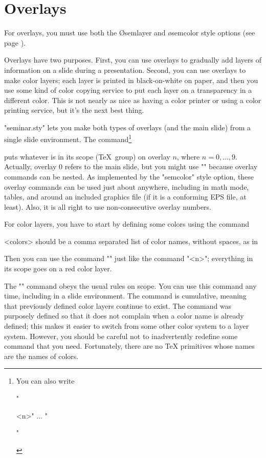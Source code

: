 \section{Overlays\label{S-overlays}}

For overlays, you must use both the \O{semlayer} and \o{semcolor} style
options (see page \pageref{o+semcolor}).

Overlays have two purposes. First, you can use overlays to gradually add
layers of information on a slide during a presentation. Second, you can use
overlays to make color layers; each layer is printed in black-on-white on
paper, and then you use some kind of color copying service to put each layer
on a transparency in a different color. This is not nearly as nice as having a
color printer or using a color printing service, but it's the next best thing.

"seminar.sty" lets you make both types of overlays (and the main slide) from a
single slide environment. The command\footnote{You can also write
\begin{Ex}
  "\begin{overlay}{<n>}" $\ldots$ "\end{overlay}"
\end{Ex}}
\begin{MD}
\end{MD}
puts whatever is in its scope (\TeX\ group) on overlay $n$, where
$n=0,\ldots,9$. Actually, overlay 0 refers to the main slide, but you might
use "" because overlay commands can be nested. As implemented by
the "semcolor" style option, these overlay commands can be used just about
anywhere, including in math mode, tables, and around an included graphics file
(if it is a conforming EPS file, at least). Also, it is all right to use
non-consecutive overlay numbers.

For color layers, you have to start by defining some colors using the command
\begin{MD}
\end{MD}
<colors> should be a comma separated list of color names, without spaces, as
in
\begin{LVerbatim}
\end{LVerbatim}
Then you can use the command "\red" just like the command \n\overlay"{<n>}";
everything in its scope goes on a red color layer.

The "" command obeys the usual rules on scope. You can use this
command any time, including in a slide environment. The command is cumulative,
meaning that previously defined color layers continue to exist. The command
was purposely defined so that it does not complain when a color name is
already defined; this makes it easier to switch from some other color system
to a layer system. However, you should be careful not to inadvertently
redefine some command that you need. Fortunately, there are no \TeX{}
primitives whose names are the names of colors.

